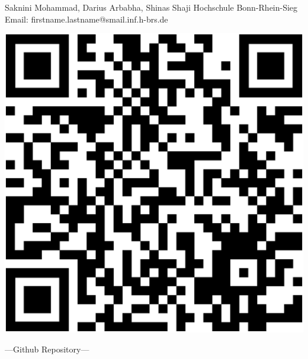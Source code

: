 

{
	\vspace*{1cm}
    \begin{minipage}{0.75\linewidth}
        Saknini Mohammad, Darius Arbabha, Shinas Shaji\newline
        Hochschule Bonn-Rhein-Sieg\newline
        Email: firstname.lastname@smail.inf.h-brs.de\newline
    \end{minipage}
    \begin{minipage}{0.24\linewidth}
        \vspace{-1.5cm}
        \begin{tikzfigure}
            \includegraphics[scale=0.2]{figures/qrcode.eps}
        \end{tikzfigure}
        ---Github Repository---
    \end{minipage}
    
}

